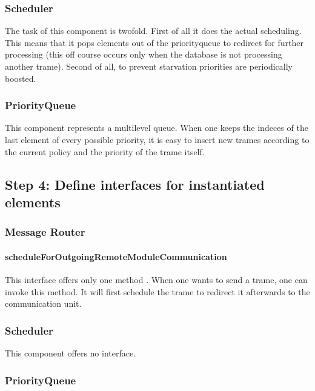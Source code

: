 \subsubsection{Scheduler}

\npar The task of this component is twofold. First of all it does the actual
scheduling. This means that it pops elements out of the priorityqueue to
redirect for further processing (this off course occurs only when the database
is not processing another trame). Second of all, to prevent starvation
priorities are periodically boosted.

\subsubsection{PriorityQueue}

\npar This component represents a multilevel queue. When one keeps the indeces
of the last element of every possible priority, it is easy to insert new trames
according to the current policy and the priority of the trame itself.

\subsection{Step 4: Define interfaces for instantiated elements}
\label{add:it6/interfaces}

\subsubsection{Message Router}

\paragraph{scheduleForOutgoingRemoteModuleCommunication} %

\npar This interface offers only one method . When one
wants to send a trame, one can invoke this method. It will first schedule
the trame to redirect it afterwards to the communication unit.

\subsubsection{Scheduler}

\npar This component offers no interface.

\subsubsection{PriorityQueue}


